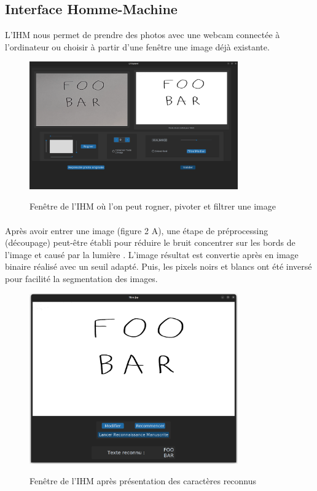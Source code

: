 \documentclass[a4paper]{article}
\begin{document}
		\subsection{Interface Homme-Machine}
			L'IHM nous permet de prendre des photos avec une webcam connectée à l'ordinateur ou choisir à partir d'une fenêtre une image déjà existante. 
			\begin{figure}[H]
				\caption{Fenêtre de l'IHM où l'on peut rogner, pivoter et filtrer une image}
				\includegraphics[width=0.8\textwidth]{modif.png}
				\centering
				\label{fig:modif}
			\end{figure}
			\paragraph{}
				Après avoir entrer une image (figure 2 A), une étape de préprocessing (découpage) peut-être établi pour réduire le bruit concentrer sur les bords de l'image et causé par la lumière .
				L'image résultat est convertie après en image binaire réalisé avec un seuil adapté. Puis, les pixels noirs et blancs ont été inversé pour facilité la segmentation des images.
			\begin{figure}[H]
				\caption{Fenêtre de l'IHM après présentation des caractères reconnus}
				\includegraphics[width=0.8\textwidth]{recon.png}
				\centering
				\label{fig:recon}
			\end{figure}
\end{document}

